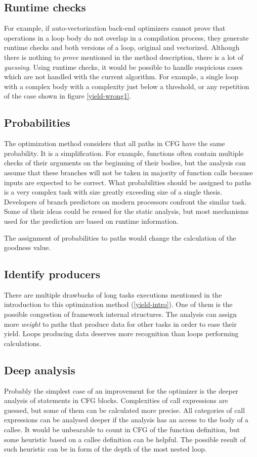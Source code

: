 \subsection{Runtime checks}
For example, if auto-vectorization back-end optimizers cannot prove that operations in a loop body do not overlap in a compilation process, they generate runtime checks and both versions of a loop, original and vectorized. Although there is nothing to \emph{prove} mentioned in the method description, there is a lot of \emph{guessing}. Using runtime checks, it would be possible to handle suspicious cases which are not handled with the current algorithm. For example, a single loop with a complex body with a complexity just below a threshold, or any repetition of the case shown in figure \ref{yield-wrong1}.

\subsection{Probabilities}
The optimization method considers that all paths in CFG have the same probability. It is a simplification. For example, functions often contain multiple checks of their arguments on the beginning of their bodies, but the analysis can assume that these branches will not be taken in majority of function calls because inputs are expected to be correct. What probabilities should be assigned to paths is a very complex task with size greatly exceeding size of a single thesis. Developers of branch predictors on modern processors confront the similar task. Some of their ideas could be reused for the static analysis, but most mechanisms used for the prediction are based on runtime information.

The assignment of probabilities to paths would change the calculation of the goodness value.

\subsection{Identify producers}
There are multiple drawbacks of long tasks executions mentioned in the introduction to this optimization method (\ref{yield-intro}). One of them is the possible congestion of framework internal structures. The analysis can assign more \emph{weight} to paths that produce data for other tasks in order to ease their yield. Loops producing data deserves more recognition than loops performing calculations.

\subsection{Deep analysis}
Probably the simplest case of an improvement for the optimizer is the deeper analysis of statements in CFG blocks. Complexities of call expressions are guessed, but some of them can be calculated more precise. All categories of call expressions can be analysed deeper if the analysis has an access to the body of a callee. It would be unbearable to count in CFG of the function definition, but some heuristic based on a callee definition can be helpful. The possible result of such heuristic can be in form of the depth of the most nested loop.
